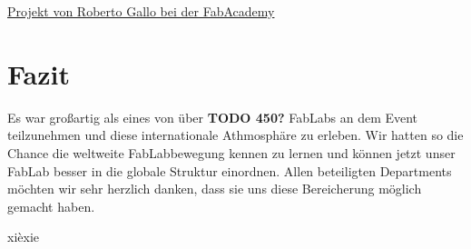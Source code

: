 \documentclass{\basedir/fablab-document}
\begin{document}
\href{http://archive.fabacademy.org/archives/2016/fablabyachay/students/302/fproject.html}{Projekt
von Roberto Gallo bei der FabAcademy}

\section*{Fazit}\label{fazit}

Es war großartig als eines von über \textbf{TODO 450?} FabLabs an dem
Event teilzunehmen und diese internationale Athmosphäre zu erleben. Wir
hatten so die Chance die weltweite FabLabbewegung kennen zu lernen und
können jetzt unser FabLab besser in die globale Struktur einordnen.
Allen beteiligten Departments möchten wir sehr herzlich danken, dass sie
uns diese Bereicherung möglich gemacht haben.

xièxie
	
\end{document}
